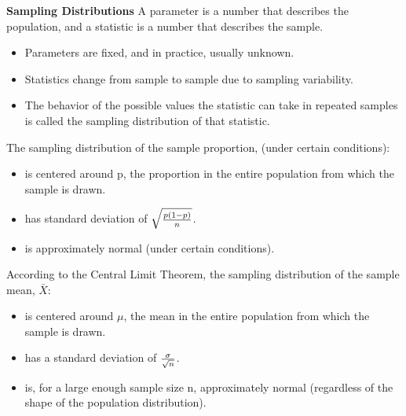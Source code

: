 \documentclass[10pt, a4paper]{article}
\begin{document}
\textbf{Sampling Distributions}
A parameter is a number that describes the population, and a statistic is a number that describes the sample.
\begin{itemize}
  \item Parameters are fixed, and in practice, usually unknown.
  \item Statistics change from sample to sample due to sampling variability.
  \item The behavior of the possible values the statistic can take in repeated samples is called the sampling distribution of that statistic.
\end{itemize}
The sampling distribution of the sample proportion, (under certain conditions):
\begin{itemize}
  \item is centered around p, the proportion in the entire population from which the sample is drawn.
  \item has standard deviation of $\sqrt{{p(1-p)\over n}}$.
  \item is approximately normal (under certain conditions).
\end{itemize}
According to the Central Limit Theorem, the sampling distribution of the sample mean, $\bar{X}$:
\begin{itemize}
\item  is centered around $\mu$, the mean in the entire population from which the sample is drawn.
\item has a standard deviation of ${\sigma \over \sqrt{n}}$.
\item is, for a large enough sample size n, approximately normal (regardless of the shape of the population distribution).
\end{itemize}
\end{document}
